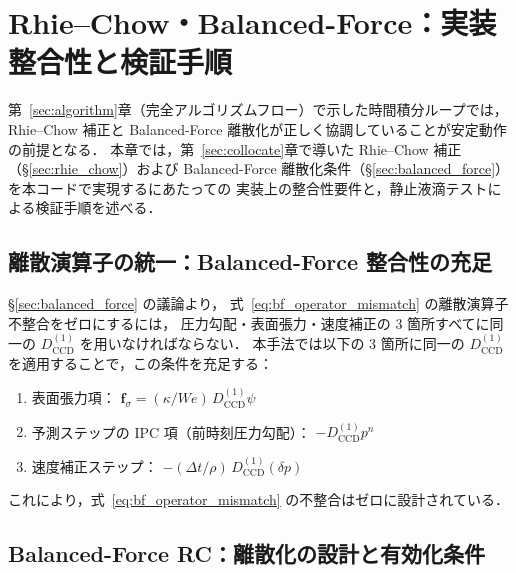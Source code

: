 \section{Rhie--Chow・Balanced-Force：実装整合性と検証手順}
\label{sec:impl_collocate}

第~\ref{sec:algorithm}章（完全アルゴリズムフロー）で示した時間積分ループでは，
Rhie--Chow 補正と Balanced-Force 離散化が正しく協調していることが安定動作の前提となる．
本章では，第~\ref{sec:collocate}章で導いた Rhie--Chow 補正（§\ref{sec:rhie_chow}）および
Balanced-Force 離散化条件（§\ref{sec:balanced_force}）を本コードで実現するにあたっての
実装上の整合性要件と，静止液滴テストによる検証手順を述べる．

\subsection{離散演算子の統一：Balanced-Force 整合性の充足}
\label{sec:impl_bf_consistency}

§\ref{sec:balanced_force} の議論より，
式~\eqref{eq:bf_operator_mismatch} の離散演算子不整合をゼロにするには，
圧力勾配・表面張力・速度補正の 3 箇所すべてに同一の $D^{(1)}_\mathrm{CCD}$ を用いなければならない．
本手法では以下の 3 箇所に同一の $D^{(1)}_\mathrm{CCD}$ を適用することで，この条件を充足する：

\begin{enumerate}
  \item 表面張力項：
        $\bm{f}_\sigma = (\kappa/We)\,D^{(1)}_\mathrm{CCD}\psi$
  \item 予測ステップの IPC 項（前時刻圧力勾配）：
        $-D^{(1)}_\mathrm{CCD} p^n$
  \item 速度補正ステップ：
        $-({\Delta t}/{\rho})\,D^{(1)}_\mathrm{CCD}(\delta p)$
\end{enumerate}

これにより，式~\eqref{eq:bf_operator_mismatch} の不整合はゼロに設計されている．

\subsection{Balanced-Force RC：離散化の設計と有効化条件}
\label{sec:impl_bf_rc}

